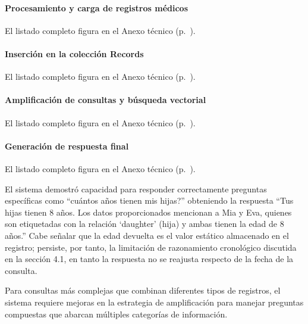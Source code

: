\paragraph{Procesamiento y carga de registros médicos}

El listado completo figura en el Anexo técnico (p.~\pageref{anexo:code-4-4-2-4}).

\paragraph{Inserción en la colección Records}

El listado completo figura en el Anexo técnico (p.~\pageref{anexo:code-4-4-2-5}).

\paragraph{Amplificación de consultas y búsqueda vectorial}

El listado completo figura en el Anexo técnico (p.~\pageref{anexo:code-4-4-2-6}).

\paragraph{Generación de respuesta final}

El listado completo figura en el Anexo técnico (p.~\pageref{anexo:code-4-4-2-7}).

El sistema demostró capacidad para responder correctamente preguntas específicas como ``cuántos años tienen mis hijas?'' obteniendo la respuesta ``Tus hijas tienen 8 años. Los datos proporcionados mencionan a Mia y Eva, quienes son etiquetadas con la relación `daughter' (hija) y ambas tienen la edad de 8 años.'' Cabe señalar que la edad devuelta es el valor estático almacenado en el registro; persiste, por tanto, la limitación de razonamiento cronológico discutida en la sección 4.1, en tanto la respuesta no se reajusta respecto de la fecha de la consulta.

Para consultas más complejas que combinan diferentes tipos de registros, el sistema requiere mejoras en la estrategia de amplificación para manejar preguntas compuestas que abarcan múltiples categorías de información. 